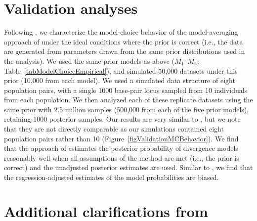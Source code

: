 \section*{Validation analyses}
Following \citet{Oaks2012}, we characterize the model-choice behavior of the
model-averaging approach of \citet{Hickerson2013} under the ideal conditions
where the prior is correct (i.e., the data are generated from parameters drawn
from the same prior distributions used in the analysis).
We used the same prior models as above ($M_1$--$M_5$;
Table~\ref{tabModelChoiceEmpirical}), and simulated 50,000 datasets under this
prior (10,000 from each model).
We used a simulated data structure of eight population pairs, with a single
1000 base-pair locus sampled from 10 individuals from each population.
We then analyzed each of these replicate datasets using the same prior with 2.5
million samples (500,000 from each of the five prior models), retaining 1000
posterior samples.
Our results are very similar to \citet{Oaks2012}, but we note that they
are not directly comparable as our simulations contained eight population
pairs rather than 10 (Figure~\ref{figValidationMCBehavior}).
We find that the approach of \citet{Hickerson2013} estimates the posterior
probability of divergence models reasonably well when all assumptions of the
method are met (i.e., the prior is correct) and the unadjusted posterior
estimates are used.
Similar to \cite{Oaks2012}, we find that the regression-adjusted estimates of
the model probabilities are biased.

\section*{Additional clarifications from \citet{Hickerson2013}}

